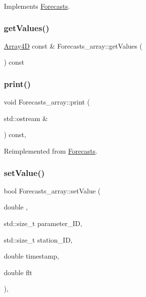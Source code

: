 Implements \mbox{\hyperlink{class_forecasts_a07a51e97b54a5c42d197fb4804ee43bc}{Forecasts}}.

\mbox{\label{class_forecasts__array_afd9f8bb1e1736bf3665073d95ae5ef8c}} 
\subsubsection{\texorpdfstring{get\+Values()}{getValues()}}
{\footnotesize\ttfamily \mbox{\hyperlink{class_array4_d}{Array4D}} const  \& Forecasts\+\_\+array\+::get\+Values (\begin{DoxyParamCaption}{ }\end{DoxyParamCaption}) const}

\mbox{\label{class_forecasts__array_a56985347f516340034b29dc4cdda87b1}} 
\subsubsection{\texorpdfstring{print()}{print()}}
{\footnotesize\ttfamily void Forecasts\+\_\+array\+::print (\begin{DoxyParamCaption}\item[{std\+::ostream \&}]{ }\end{DoxyParamCaption}) const\hspace{0.3cm}{\ttfamily [override]}, {\ttfamily [virtual]}}



Reimplemented from \mbox{\hyperlink{class_forecasts_addb1f75f0dc6833c466453c51256812c}{Forecasts}}.

\mbox{\label{class_forecasts__array_a3b5557b58352d846c4fddc095f87589d}} 
\subsubsection{\texorpdfstring{set\+Value()}{setValue()}}
{\footnotesize\ttfamily bool Forecasts\+\_\+array\+::set\+Value (\begin{DoxyParamCaption}\item[{double}]{,  }\item[{std\+::size\+\_\+t}]{parameter\+\_\+\+ID,  }\item[{std\+::size\+\_\+t}]{station\+\_\+\+ID,  }\item[{double}]{timestamp,  }\item[{double}]{flt }\end{DoxyParamCaption})\hspace{0.3cm}{\ttfamily [override]}, {\ttfamily [virtual]}}



